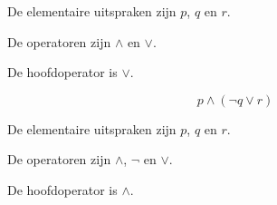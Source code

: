 \documentclass{ximera}
\begin{document}
\begin{oefening}{\oefU \ESS}
\begin{question}
\begin{oplossing}
De elementaire uitspraken zijn $p$, $q$ en $r$.

De operatoren zijn $\land$ en $\lor$.

De hoofdoperator is $\lor$.

\end{oplossing}

\end{question}



\begin{question}

\[
p\land(\neg q\lor r)
\]

\begin{oplossing}

De elementaire uitspraken zijn $p$, $q$ en $r$.

De operatoren zijn $\land$, $\neg$ en $\lor$.

De hoofdoperator is $\land$.

\end{oplossing}

\end{question}

\end{oefening}
\end{document}
